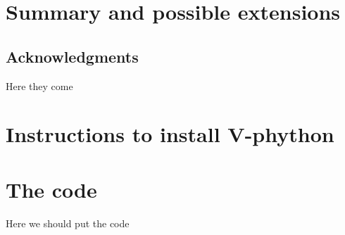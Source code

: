 \documentclass[12pt]{iopart}
\begin{document}
\section{Summary and possible extensions}

%



\subsection{Acknowledgments}
Here they come

\appendix
\section{Instructions to install V-phython}
\label{appendix:python}

\section{The code}
Here we should put the code
 



\end{document}

